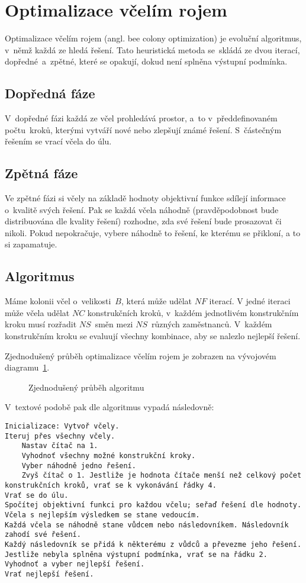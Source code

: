 \documentclass[twoside]{ctuthesis}
\begin{document}
\section{Optimalizace včelím rojem}
Optimalizace včelím rojem (angl. bee colony optimization) je evoluční algoritmus, v~němž každá ze  hledá řešení. Tato heuristická metoda se~skládá ze dvou iterací, dopředné~a~zpětné, které se opakují, dokud není splněna výstupní podmínka. \cite{teodorovic2009bee}

\subsection{Dopředná fáze}
V~dopředné fázi každá ze včel prohledává prostor, a~to v~předdefinovaném počtu~kroků, kterými vytváří nové nebo zlepšují známé řešení. S~částečným řešením se vrací včela do úlu. \cite{teodorovic2009bee}

\subsection{Zpětná fáze}
Ve zpětné fázi si včely na základě hodnoty objektivní funkce sdílejí informace o~kvalitě svých řešení. Pak se každá včela náhodně (pravděpodobnost bude distribuována dle kvality řešení) rozhodne, zda své řešení bude prosazovat či nikoli. Pokud nepokračuje, vybere náhodně to řešení, ke kterému se přikloní, a to si zapamatuje. \cite{teodorovic2009bee}

\subsection{Algoritmus}
Máme kolonii včel o~velikosti~$B$, která může udělat $NF$ iterací. V jedné iteraci může včela udělat $NC$ konstrukčních kroků, v~každém jednotlivém konstrukčním kroku musí rozřadit $NS$~směn mezi $NS$~různých zaměstnanců. V~každém konstrukčním kroku se evaluují všechny kombinace, aby se nalezlo nejlepší řešení. \cite{khader2013artificial}

Zjednodušený průběh optimalizace včelím rojem je zobrazen na vývojovém diagramu~\ref{fig:beeflow}.
\begin{figure}[h]
	
	\caption{Zjednodušený průběh algoritmu}
	\label{fig:beeflow}
\end{figure}

V~textové podobě pak dle \cite{rajeswari2017directed} algoritmus vypadá následovně:
\begin{lstlisting}
Inicializace: Vytvoř včely.
Iteruj přes všechny včely.
	Nastav čítač na 1.
	Vyhodnoť všechny možné konstrukční kroky.
	Vyber náhodně jedno řešení.
	Zvyš čítač o 1. Jestliže je hodnota čítače menší než celkový počet konstrukčních kroků, vrať se k vykonávání řádky 4.
Vrať se do úlu.
Spočítej objektivní funkci pro každou včelu; seřaď řešení dle hodnoty.
Včela s nejlepším výsledkem se stane vedoucím.
Každá včela se náhodně stane vůdcem nebo následovníkem. Následovník zahodí své řešení.
Každý následovník se přidá k některému z vůdců a převezme jeho řešení.
Jestliže nebyla splněna výstupní podmínka, vrať se na řádku 2.
Vyhodnoť a vyber nejlepší řešení.
Vrať nejlepší řešení.
\end{lstlisting}
\end{document}
